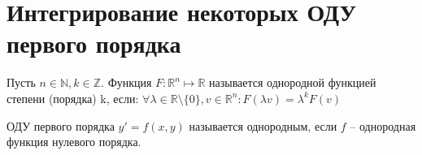 \documentclass[document.tex]{subfiles}
\begin{document}
\section{Интегрирование некоторых ОДУ первого порядка}
\begin{definition}
Пусть $n \in \mathbb{N}, k \in \mathbb{Z}$. Функция $F : \mathbb{R}^n \mapsto \mathbb{R}$ называется однородной функцией степени (порядка) k, если: $\forall \lambda \in \mathbb{R} \setminus \{0\}, v \in \mathbb{R}^n: F(\lambda v) = \lambda^k F(v)$
\end{definition}
\begin{definition}
\label{homogen_diff_eq_def1}
ОДУ первого порядка $y' = f(x, y)$ называется однородным, если $f$ -- однородная функция нулевого порядка.
\end{definition}
\end{document}
